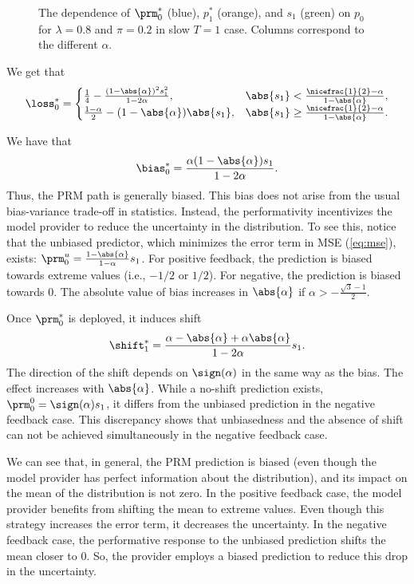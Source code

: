 \begin{figure}[ht]
    \centering
    
    \caption{The dependence of $\prm^*_0$ (blue), $p^*_1$ (orange), and $s_1$
    (green) on $p_0$ for $\lambda = 0.8$ and $\pi = 0.2$ in slow $T=1$ case.
    Columns correspond to the different $\alpha$.}
    \label{fig:one-slow-sol}
\end{figure}

 We get that
\[
    \loss^*_0 =
    \begin{cases}
        \frac{1}{4} - \frac{(1 - \abs{\alpha})^2 s_1^2}{1 - 2 \alpha},
        & \abs{s_1} < \frac{\nicefrac{1}{2} - \alpha}{1 - \abs{\alpha}},\\
        \frac{1 - \alpha}{2} - (1 - \abs{\alpha}) \abs{s_1},
        & \abs{s_1} \ge \frac{\nicefrac{1}{2} - \alpha}{1 - \abs{\alpha}}.
    \end{cases}
\]

 We have that $$\bias^*_0 = \frac{\alpha (1 - \abs{\alpha}) s_1}{1 - 2 \alpha}.$$
Thus, the PRM path is generally biased. This bias does not arise from the usual
bias-variance trade-off in statistics. Instead, the performativity incentivizes
the model provider to reduce the uncertainty in the distribution. To see this, notice that the unbiased predictor, which minimizes the error term in MSE
(\ref{eq:mse}), exists: $\prm^u_0 = \frac{1 - \abs{\alpha}}{1 - \alpha} s_1$.
For positive feedback, the prediction is biased towards extreme values
(i.e., $-1/2$ or $1/2$). For negative, the prediction is biased towards
$0$. The absolute value of bias increases in $\abs{\alpha}$ if $\alpha >
-\frac{\sqrt{3} - 1}{2}$.

 Once $\prm^*_0$ is deployed, it induces shift $$\shift^*_1 = \frac{\alpha - \abs{\alpha} + \alpha \abs{\alpha}}{1 - 2\alpha} s_1.$$
The direction of the shift depends on $\sign(\alpha)$ in the same way as the
bias. The effect increases with $\abs{\alpha}$. While a no-shift prediction
exists, $\prm^0_0 = \sign(\alpha) s_1$, it differs from the unbiased prediction
in the negative feedback case. This discrepancy shows that unbiasedness and the
absence of shift can not be achieved simultaneously in the negative feedback
case.

 We can see that, in general, the PRM prediction is biased (even though the
model provider has perfect information about the distribution), and its impact
on the mean of the distribution is not zero. In the positive feedback case, the
model provider benefits from shifting the mean to extreme values. Even though
this strategy increases the error term, it decreases the uncertainty. In the
negative feedback case, the performative response to the unbiased prediction
shifts the mean closer to $0$. So, the provider employs a biased prediction to
reduce this drop in the uncertainty.

